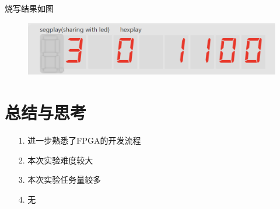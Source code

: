 \documentclass{article}
\begin{document}
		烧写结果如图
		\begin{figure}[htbp]
			\centering
			\includegraphics[scale=0.8]{4s.png}
		\end{figure}

	\clearpage
    \section{总结与思考}
	\begin{enumerate}
		\item [1.]进一步熟悉了FPGA的开发流程
		\item [2.]本次实验难度较大
		\item [3.]本次实验任务量较多
		\item [4.]无
	\end{enumerate}
\end{document}
